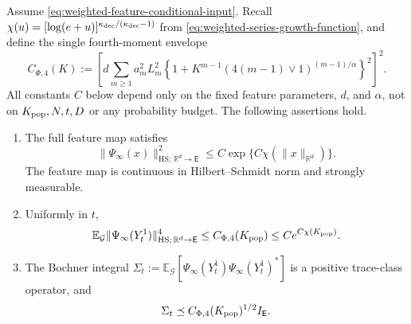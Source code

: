 \begin{lemma}
\label{lemma-weighted-feature-envelope-derived}
Assume \eqref{eq:weighted-feature-conditional-input}. Recall
$\chi(u)=[\log(e+u)]^{\kappa_{\rm dec}/(\kappa_{\rm dec}-1)}$ from
\eqref{eq:weighted-series-growth-function}, and define the single fourth-moment envelope
\begin{equation}
\label{eq:conditional-weighted-fourth-envelope}
 C_{\Phi,4}(K):=
 \left[d\sum_{m\ge1}a_m^2L_m^2
 \left\{1+K^{m-1}(4(m-1)\vee1)^{(m-1)/\alpha}\right\}^2\right]^2.
\end{equation}
All constants $C$ below depend only on the fixed feature parameters,
$d$, and $\alpha$, not on $K_{\rm pop},N,t,D$ or any probability budget.
The following assertions hold.
\begin{enumerate}
 \item The full feature map satisfies
 \begin{equation}
 \label{eq:derived-weighted-feature-growth}
 \|\Psi_\infty(x)\|_{\mathrm{HS};\,\mathbb R^d\to\mathsf E}^2
 \le C\exp\{C\chi(\|x\|_{\mathbb R^d})\}.
 \end{equation}
 The feature map is continuous in Hilbert--Schmidt norm and strongly
 measurable.
 \item Uniformly in $t$,
 \begin{equation}
 \label{eq:derived-weighted-fourth-moment}
 \mathbb E_{\mathcal G}\|\Psi_\infty(Y_t^1)\|_{\mathrm{HS};\,\mathbb R^d\to\mathsf E}^4
 \le C_{\Phi,4}(K_{\rm pop})\le C e^{C\chi(K_{\rm pop})}.
 \end{equation}
 \item The Bochner integral
 $\Sigma_t:=\mathbb E_{\mathcal G}[\Psi_\infty(Y_t^1)\Psi_\infty(Y_t^1)^*]$
 is a positive trace-class operator, and
 \begin{equation}
 \label{eq:derived-weighted-covariance-bound}
 \Sigma_t\preceq C_{\Phi,4}(K_{\rm pop})^{1/2}I_{\mathsf E}.
 \end{equation}
\end{enumerate}
\end{lemma}
